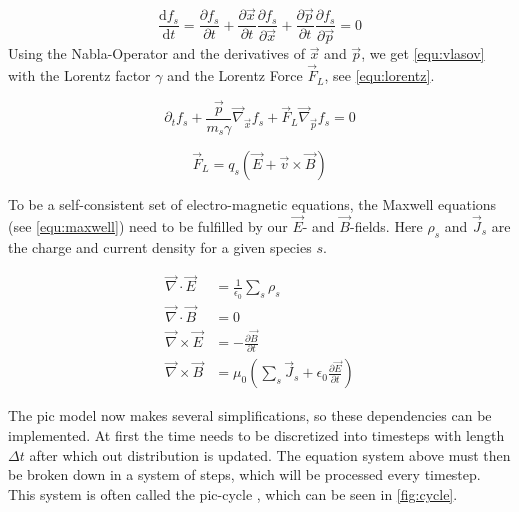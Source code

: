 \documentclass[bachelor_thesis]{subfiles}
\begin{document}
\begin{equation}
	\frac{\mathrm{d}f_s}{\mathrm{d}t}=\frac{\partial f_s}{\partial t} + \frac{\partial \vec{x}}{\partial t} \frac{\partial f_s}{\partial \vec{x}} + \frac{\partial \vec{p}}{\partial t} \frac{\partial f_s}{\partial \vec{p}} = 0
	\label{equ:boltz}
\end{equation}
Using the Nabla-Operator and the derivatives of $\vec{x}$ and $\vec{p}$, we get \autoref{equ:vlasov} with the Lorentz factor $\gamma$ and the Lorentz Force $\vec{F}_L$, see \autoref{equ:lorentz}.

\begin{equation}
	\partial_t f_s + \frac{\vec{p}}{m_s \gamma} \vec{\nabla}_{\vec{x}} f_s + \vec{F}_L \vec{\nabla}_{\vec{p}} f_s = 0
	\label{equ:vlasov}
\end{equation}

\begin{equation}
	\vec{F}_L=q_s\left(\vec{E}+\vec{v}\times\vec{B}\right)
	\label{equ:lorentz}
\end{equation}

To be a self-consistent set of electro-magnetic equations, the Maxwell equations (see \autoref{equ:maxwell}) need to be fulfilled by our $\vec{E}$- and $\vec{B}$-fields. Here $\rho_s$ and $\vec{J}_s$ are the charge and current density for a given species $s$.

\begin{equation}
\begin{aligned}
	\vec{\nabla}\cdot\vec{E}  &= \frac{1}{\epsilon_0}\sum_s \rho_s 									\\
	\vec{\nabla}\cdot\vec{B}  &= 0 														\\
	\vec{\nabla}\times\vec{E} &= -\frac{\partial \vec{B}}{\partial t}									\\
	\vec{\nabla}\times\vec{B}&= \mu_0 \left(\sum_s \vec{J}_s + \epsilon_0 \frac{\partial \vec{E}}{\partial t}\right)	
\end{aligned}
\label{equ:maxwell}
\end{equation}

The \gls{pic} model now makes several simplifications, so these dependencies can be implemented.
At first the time needs to be discretized into timesteps with length $\Delta t$ after which out distribution is updated. The equation system above must then be broken down in a system of steps, which will be processed every timestep.
This system is often called the \gls{pic}-cycle \cite{Huebl2019}, which can be seen in \autoref{fig:cycle}.
\end{document}
